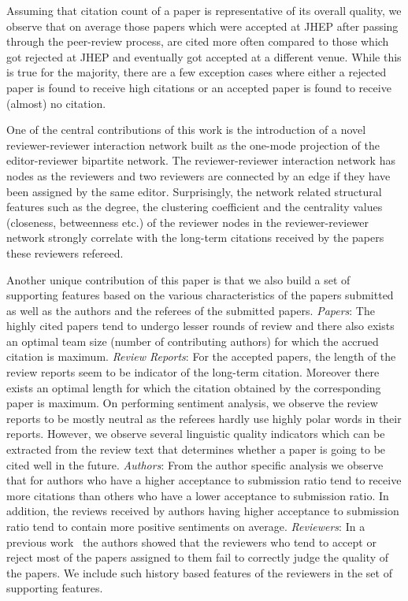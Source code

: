   Assuming that citation count of a paper is representative of its overall quality, we observe that on average those papers which were accepted at JHEP after passing through the peer-review process, are cited more often compared to those which got rejected at JHEP and eventually got accepted at a different venue. While this is true for the majority, there are a few exception cases where either a rejected paper is found to receive high citations or an accepted paper is found to receive (almost) no citation. 

 One of the central contributions of this work is the introduction of a novel reviewer-reviewer interaction network built as the one-mode projection of the editor-reviewer bipartite network. The reviewer-reviewer interaction network has nodes as the reviewers and two reviewers are connected by an edge if they have been assigned by the same editor. Surprisingly, the network related structural features such as the degree, the clustering coefficient and the centrality values (closeness, betweenness etc.) of the reviewer nodes in the reviewer-reviewer network strongly correlate with the  long-term citations received by the papers these reviewers refereed. 

 Another unique contribution of this paper is that we also build a set of supporting features based on the various characteristics of the papers submitted as well as the authors and the referees of the submitted papers. {\em Papers}: The highly cited papers tend to undergo lesser rounds of review and there also exists an optimal team size (number of contributing authors) for which the accrued citation is maximum.
{\em Review Reports}: For the accepted papers, the length of the review reports seem to be indicator of the long-term citation. Moreover there exists an optimal length for which the citation obtained by the corresponding paper is maximum. On performing sentiment analysis, we observe the review reports to be mostly neutral as the referees hardly use highly polar words in their reports. However, we observe several linguistic quality indicators which can be extracted from the review text that determines whether a paper is going to be cited well in the future. {\em Authors}: From the author specific analysis we observe that for authors who have a higher acceptance to submission ratio tend to receive more citations than others who have a lower acceptance to submission ratio. In addition, the reviews received by authors having higher acceptance to submission ratio tend to contain more positive sentiments on average. {\em Reviewers}: In a previous work~\cite{sikdar2016anomalies} the authors showed that the reviewers who tend to accept or reject most of the papers assigned to them fail to correctly judge the quality of the papers. We include such history based features of the reviewers in the set of supporting features. 

